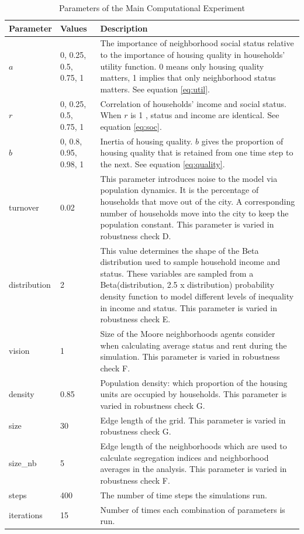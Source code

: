 \begin{table}[h!]
  \centering
  \caption{Parameters of the Main Computational Experiment}
  \begin{tabularx}{\textwidth}{l l X}
    \hline
    \textbf{Parameter} & \textbf{Values} & \textbf{Description} \\
    \hline
    $a$ & 0, 0.25, 0.5, 0.75, 1 & The importance of neighborhood social status relative 						to the importance of housing quality in households' 							utility function. 0 means only housing quality 									matters, 1 implies that only neighborhood status 								matters. See equation \ref{eq:util}. \\
    $r$ &  0, 0.25, 0.5, 0.75, 1 & Correlation of households' income and social status. 						When $r$ is 1 , status and income are identical. See 							equation \ref{eq:soc}. \\
    $b$ & 0, 0.8, 0.95, 0.98, 1 & Inertia of housing quality. $b$ gives the proportion of 			housing quality that is retained from one time step to the next. See equation 					\ref{eq:quality}. \\
    turnover & 0.02 & This parameter introduces noise to the model via 							population dynamics. It is the percentage of households that move out of the city. A corresponding number of households move into the city to keep the population constant. This parameter is varied in robustness check D.\\
    distribution & 2 & This value determines the shape of the Beta distribution used to sample household income and status. These variables are sampled from a 	Beta(distribution, 2.5 x distribution) probability density function to model different levels of inequality in income and status. This parameter is varied in robustness check E.\\
    vision & 1 & Size of the Moore neighborhoods agents consider when calculating average status and rent during the simulation. This parameter is varied in robustness check F. \\
    density & 0.85 & Population density: which proportion of the housing units are occupied by households. This parameter is varied in robustness check G. \\
    size & 30 & Edge length of the grid. This parameter is varied in robustness check G. \\
    size\_nb & 5 & Edge length of the neighborhoods which are used to calculate segregation indices and neighborhood averages in the analysis. This parameter is varied in robustness check F.\\
    steps & 400 & The number of time steps the simulations run. \\
    iterations & 15 & Number of times each combination of parameters is run.\\
    \hline
    \end{tabularx}%
  \label{tab:parameters}%
\end{table}%